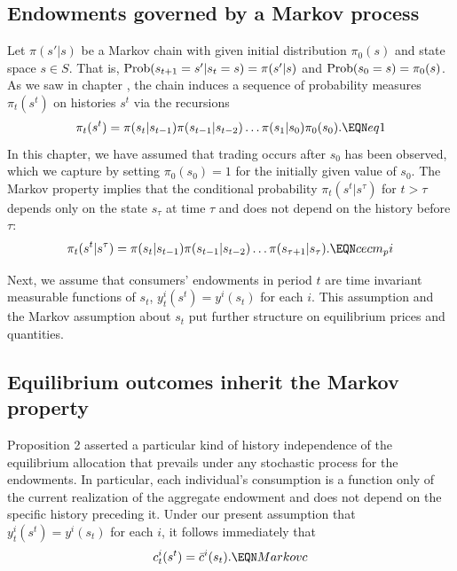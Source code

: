 \subsection{Endowments governed by a Markov process}
Let $\pi(s'|s)$ be a Markov chain with given initial distribution
$\pi_0(s)$ and state space $s\in S$.   That is, ${\rm
Prob}(s_{t+1}  = s' \vert
 s_t = s) =\pi(s'|s)$ and ${\rm Prob}  (s_0 = s) = \pi_0(s)$.
As we saw in chapter ,
 the chain induces a sequence of probability
measures $\pi_t(s^t)$  on histories $s^t$
via the recursions
$$ \pi_t(s^t) = \pi(s_t | s_{t-1}) \pi(s_{t-1} | s_{t-2}) \ldots
       \pi(s_1 | s_0)   \pi_0(s_0) . \EQN eq1  $$
In this chapter, we have assumed that trading occurs after $s_0$ has been observed,
which we capture by setting $\pi_0(s_0)=1$ for the initially
given value of $s_0$.
The Markov property implies that the conditional probability
$\pi_t(s^t\vert s^\tau)$ for $t>\tau$ depends only on the state
$s_\tau$ at time $\tau$ and does not depend on the history
before $\tau$:
$$\pi_t(s^t|s^\tau) = \pi(s_t\vert s_{t-1}) \pi(s_{t-1} \vert s_{t-2})
          \ldots\pi(s_{\tau+1} \vert s_\tau).\EQN cecm_pi$$


Next, we assume that consumers' endowments in period $t$ are
time invariant measurable functions of $s_t$,
$y^i_t(s^t)=y^i(s_t)$ for each $i$. %
This assumption and  the Markov assumption about  $s_t$ put
 further structure on  equilibrium prices and quantities.


\subsection{Equilibrium outcomes inherit the Markov property}
Proposition 2  asserted a particular kind of history independence
of the equilibrium allocation that prevails under any
stochastic process for the endowments. In particular, each
individual's consumption is  a function only of the current
realization of the aggregate endowment and does not depend on the
specific history preceding it. Under %
our present assumption that $y_t^i(s^t)= y^i(s_t)$ for each $i$, it follows immediately that
$$
c^i_t(s^t) = \bar c^i(s_t).     \EQN Markovc
$$

